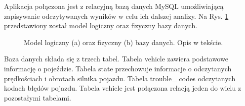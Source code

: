 \documentclass[12pt, twoside]{article} %
\numberwithin{equation}{subsection}
\numberwithin{figure}{section}
\numberwithin{table}{section}
\begin{document}
	\hspace{0.5cm}Aplikacja połączona jest z relacyjną bazą danych MySQL umożliwiającą zapisywanie odczytywanych wyników w celu ich dalszej analizy. Na Rys. \ref{rys_database_model} przedstawiony został model logiczny oraz fizyczny bazy danych.
	
		\begin{figure}[!h]
			\centering
			\caption{Model logiczny (a) oraz fizyczny (b) bazy danych. Opis w tekście.}
			\label{rys_database_model}
		\end{figure} 	
	
	Baza danych składa się z trzech tabel. Tabela vehicle zawiera podstawowe informację o pojeździe. Tabela state przechowuje informacje o odczytanych prędkościach i obrotach silnika pojazdu. Tabela trouble\_ codes odczytanych kodach błędów pojazdu. Tabela vehicle jest połączona relacją jeden do wielu z pozostałymi tabelami.
	
\end{document}
